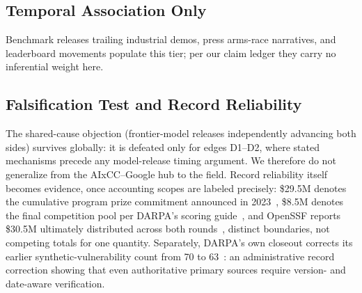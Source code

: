 \documentclass[conference,compsoc]{IEEEtran}
\begin{document}
\subsection{Temporal Association Only}
Benchmark releases trailing industrial demos, press arms-race narratives, and leaderboard
movements populate this tier; per our claim ledger they carry no inferential weight here.

\subsection{Falsification Test and Record Reliability}
The shared-cause objection (frontier-model releases independently advancing both sides) 
survives globally: it is defeated only for edges D1--D2, where stated mechanisms precede any
model-release timing argument. We therefore do not generalize from the AIxCC--Google hub to the
field. Record reliability itself becomes evidence, once accounting scopes are labeled precisely:
\$29.5M denotes the cumulative program prize commitment announced in 2023~\cite{darpa2023aixcc}, \$8.5M denotes the
final competition pool per DARPA's scoring guide~\cite{darpascoring2025}, and OpenSSF reports
\$30.5M ultimately distributed across both rounds~\cite{openssfaixcc2026}, distinct
boundaries, not competing totals for one quantity. Separately, DARPA's own closeout corrects
its earlier synthetic-vulnerability count from 70 to 63~\cite{darparesults2025}: an
administrative record correction showing that even authoritative primary sources require
version- and date-aware verification.



\end{document}
